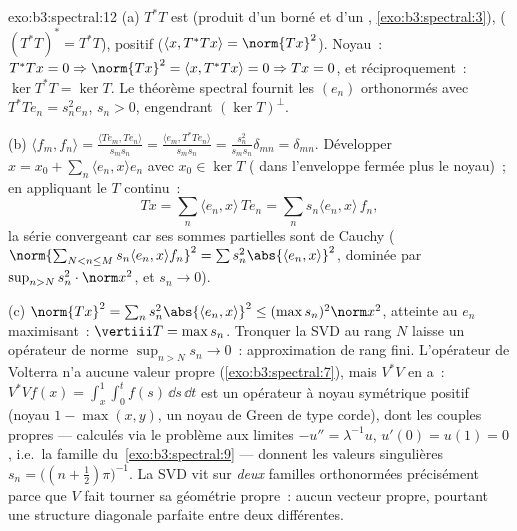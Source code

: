 \begin{solution}{exo:b3:spectral:12}
(a) $T^*T$ est  (produit d'un borné et d'un ,
\cref{exo:b3:spectral:3}),  ($(T^*T)^* =
T^*T$), positif ($\langle x, T^*Tx\rangle = \norm{Tx}^2$).
Noyau~: $T^*Tx = 0 \Rightarrow \norm{Tx}^2 = \langle x,
T^*Tx\rangle = 0 \Rightarrow Tx = 0$, et
réciproquement~: $\ker T^*T = \ker T$. Le théorème spectral
fournit les $(e_n)$ orthonormés avec $T^*Te_n = s_n^2e_n$,
$s_n > 0$, engendrant $(\ker T)^\perp$.

(b) $\langle f_m, f_n\rangle = \frac{\langle Te_m,
Te_n\rangle}{s_ms_n} = \frac{\langle e_m,
T^*Te_n\rangle}{s_ms_n} = \frac{s_n^2}{s_ms_n}\delta_{mn} =
\delta_{mn}$. Développer $x = x_0 + \sum_n\langle e_n,
x\rangle e_n$ avec $x_0 \in \ker T$ ( dans
l'enveloppe fermée plus le noyau)~; en appliquant le $T$
continu~:
\[
Tx = \sum_n\langle e_n, x\rangle\,Te_n =
\sum_ns_n\langle e_n, x\rangle\,f_n,
\]
la série convergeant car ses sommes partielles sont de
Cauchy ($\norm{\sum_{N<n\leq M}s_n\langle e_n, x\rangle
f_n}^2 = \sum s_n^2\abs{\langle e_n, x\rangle}^2$, dominée
par $\sup_{n>N}s_n^2\cdot\norm x^2$, et $s_n \to 0$).

(c) $\norm{Tx}^2 = \sum_ns_n^2\abs{\langle e_n, x\rangle}^2
\leq (\max s_n)^2\norm x^2$, atteinte au $e_n$ maximisant~:
$\vertiii T = \max s_n$. Tronquer la SVD au rang $N$ laisse
un opérateur de norme $\sup_{n>N}s_n \to 0$~: approximation
de rang fini. L'opérateur de Volterra n'a aucune valeur
propre (\cref{exo:b3:spectral:7}), mais $V^*V$ en a~:
$V^*Vf(x) = \int_x^1\int_0^tf(s)\,\dd s\,\dd t$ est un
opérateur à noyau symétrique positif (noyau $1 -
\max(x,y)$, un noyau de Green de type corde), dont les
couples propres --- calculés via le problème aux limites
$-u'' = \lambda^{-1}u$, $u'(0) = u(1) = 0$, i.e.\ la
famille du~\cref{exo:b3:spectral:9} --- donnent les valeurs
singulières $s_n = \bigl((n + \frac12)\pi\bigr)^{-1}$. La
SVD vit sur \emph{deux} familles orthonormées précisément
parce que $V$ fait tourner sa géométrie propre~: aucun
vecteur propre, pourtant une structure diagonale parfaite
entre deux  différentes.
\end{solution}

